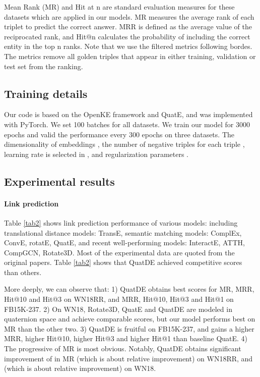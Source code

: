 \documentclass[letterpaper]{article} \usepackage{aaai20}  \usepackage{times}  \usepackage{helvet} \usepackage{courier}  \usepackage[hyphens]{url}  \usepackage{graphicx} \usepackage{lineno,hyperref,amsmath,amssymb}
\begin{document}
Mean Rank (MR) and Hit at n are standard evaluation measures for these datasets which are applied in our models. MR measures the average rank of each triplet to predict the correct answer. MRR is defined as the average value of the reciprocated rank, and Hit@n calculates the probability of including the correct entity in the top n ranks. Note that we use the filtered metrics following bordes\cite{bordes2013translating}. The metrics remove all golden triples that appear in either training, validation or test set from the ranking.

\subsection{Training details}

Our code is based on the OpenKE framework and QuatE, and was implemented with PyTorch. We set 100 batches for all datasets. We train our model for 3000 epochs and valid the performance every 300 epochs on three datasets. The dimensionality of embeddings , the number of negative triples for each triple , learning rate is selected in , and  regularization parameters . 

\subsection{Experimental results}

\paragraph{\textbf{Link prediction}}Table \ref{tab2} shows link prediction performance of various models: including translational distance models: TransE\cite{bordes2013translating}, semantic matching models: ComplEx\cite{trouillon2016complex}, ConvE\cite{dettmers2018convolutional}, rotatE\cite{sun2019rotate}, QuatE\cite{zhang2019quaternion}, and recent well-performing models: InteractE\cite{vashishth2020interacte}, ATTH\cite{chami2020low}, CompGCN\cite{vashishth2019composition}, Rotate3D\cite{gao2020rotate3d}. Most of the experimental data are quoted from the original papers. Table \ref{tab2} shows that QuatDE achieved competitive scores than others.

More deeply, we can observe that: 1) QuatDE obtains best scores for MR, MRR, Hit@10 and Hit@3 on WN18RR, and MRR, Hit@10, Hit@3 and Hit@1 on FB15K-237. 2) On WN18, Rotate3D, QuatE and QuatDE are modeled in quaternion space and achieve comparable scores, but our model performs best on MR than the other two. 3) QuatDE is fruitful on FB15K-237, and gains a  higher MRR,  higher Hit@10,  higher Hit@3 and  higher Hit@1 than baseline QuatE. 4) The progressive of MR is most obvious. Notably, QuatDE obtains significant improvement of  in MR (which is about  relative improvement) on WN18RR, and  (which is about  relative improvement) on WN18.
\end{document}
